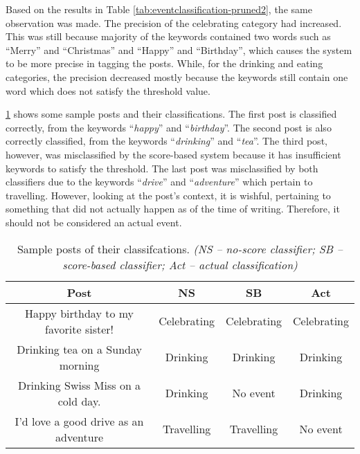 Based on the results in Table \ref{tab:eventclassification-pruned2}, the same observation was made. The precision of the celebrating category had increased. This was still because majority of the keywords contained two words such as ``Merry'' and ``Christmas'' and ``Happy'' and ``Birthday'', which causes the system to be more precise in tagging the posts. While, for the drinking and eating categories, the precision decreased mostly because the keywords still contain one word which does not satisfy the threshold value.


\ref{tab:classification-sampleposts} shows some sample posts and their classifications. The first post is classified correctly, from the keywords ``\textit{happy}'' and ``\textit{birthday}''. The second post is also correctly classified, from the keywords ``\textit{drinking}'' and ``\textit{tea}''. The third post, however, was misclassified by the score-based system because it has insufficient keywords to satisfy the threshold. The last post was misclassified by both classifiers due to the keywords ``\textit{drive}'' and ``\textit{adventure}'' which pertain to travelling. However, looking at the post’s context, it is wishful, pertaining to something that did not actually happen as of the time of writing. Therefore, it should not be considered an actual event.

\begin{table}[ph!]   %
	\centering
	\caption{Sample posts of their classifcations. \textit{(NS – no-score classifier; SB – score-based classifier; Act – actual classification)}} \vspace{0.25em}
	\begin{tabular}{|c|c|c|c|} \hline
		\centering Post & NS & SB & Act \\ \hline
		Happy birthday to my favorite sister! & Celebrating & Celebrating & Celebrating \\ \hline
		Drinking tea on a Sunday morning & Drinking & Drinking & Drinking \\ \hline
		Drinking Swiss Miss on a cold day. & Drinking & No event & Drinking \\ \hline
		I'd love a good drive as an adventure & Travelling & Travelling & No event \\ \hline
	\end{tabular}
	\label{tab:classification-sampleposts}
\end{table}


